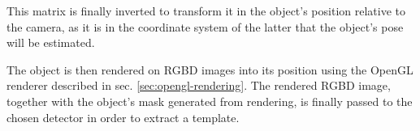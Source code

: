 This matrix is finally inverted to transform it in the object's position
relative to the camera, as it is in the coordinate system of the latter that the
object's pose will be estimated.

The object is then rendered on RGBD images into its position using the OpenGL renderer
described in sec. \ref{sec:opengl-rendering}. The rendered RGBD image, together
with the object's mask generated from rendering, is finally passed to the chosen
detector in order to extract a template.
